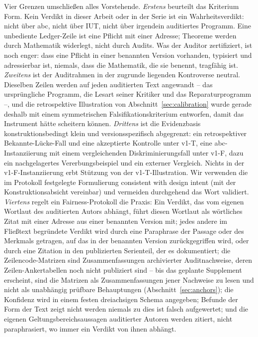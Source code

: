 \documentclass[11pt,a4paper]{article}
\begin{document}
Vier Grenzen umschließen alles Vorstehende. \emph{Erstens} beurteilt das
Kriterium Form. Kein Verdikt in dieser Arbeit oder in der Serie ist ein
Wahrheitsverdikt: nicht über abc, nicht über IUT, nicht über irgendein
auditiertes Programm. Eine unbediente Ledger-Zeile ist eine Pflicht mit einer
Adresse; Theoreme werden durch Mathematik widerlegt, nicht durch Audits. Was
der Auditor zertifiziert, ist noch enger: dass eine Pflicht in einer benannten
Version vorhanden, typisiert und adressierbar ist, niemals, dass die
Mathematik, die sie benennt, tragfähig ist. \emph{Zweitens} ist der
Auditrahmen in der zugrunde liegenden Kontroverse neutral. Dieselben Zeilen
werden auf jeden auditierten Text angewandt -- das ursprüngliche Programm,
die Lesart seiner Kritiker und das Reparaturprogramm --, und die
retrospektive Illustration von Abschnitt~\ref{sec:calibration} wurde gerade
deshalb mit einem symmetrischen Falsifikationskriterium entworfen, damit das
Instrument hätte scheitern können. \emph{Drittens} ist die Evidenzbasis
konstruktionsbedingt klein und versionsspezifisch abgegrenzt: ein retrospektiver
Bekannte-Lücke-Fall und eine akzeptierte Kontrolle unter v1-T, eine
abc-Instanziierung mit einem vergleichenden Diskriminierungsfall unter v1-F,
dazu ein nachgelagertes Vererbungsbeispiel und ein externer Vergleich. Nichts
in der v1-F-Instanziierung erbt Stützung von der v1-T-Illustration. Wir
verwenden die im Protokoll festgelegte Formulierung \glqq consistent with design
intent\grqq{} (mit der Konstruktionsabsicht vereinbar) und vermeiden durchgehend
das Wort \glqq validiert\grqq{}. \emph{Viertens} regelt ein Fairness-Protokoll die
Praxis: Ein Verdikt, das vom eigenen Wortlaut des auditierten Autors abhängt,
führt diesen Wortlaut als wörtliches Zitat mit einer Adresse aus einer
benannten Version mit; jedes andere im Fließtext begründete Verdikt wird
durch eine Paraphrase der Passage oder des Merkmals getragen, auf das in der
benannten Version zurückgegriffen wird, oder durch eine Zitation in den
publizierten Serienteil, der es dokumentiert; die Zeilencode-Matrizen sind
Zusammenfassungen archivierter Auditnachweise, deren Zeilen-Ankertabellen
noch nicht publiziert sind -- bis das geplante Supplement erscheint, sind
die Matrizen als Zusammenfassungen jener Nachweise zu lesen und nicht als
unabhängig prüfbare Behauptungen (Abschnitt~\ref{sec:anchors}); die Konfidenz
wird in einem festen dreiachsigen Schema angegeben; Befunde der Form \glqq der
Text zeigt nicht\grqq{} werden niemals zu \glqq dies ist falsch\grqq{} aufgewertet; und die
eigenen Geltungsbereichsaussagen auditierter Autoren werden zitiert, nicht
paraphrasiert, wo immer ein Verdikt von ihnen abhängt.
\end{document}
